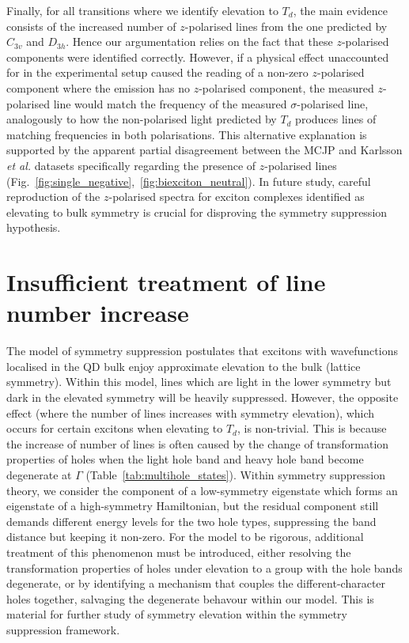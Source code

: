 Finally, for all transitions where we identify elevation to $T_d$, the main evidence consists of the increased number of $z$-polarised lines from the one predicted by $C_{3v}$ and $D_{3h}$. Hence our argumentation relies on the fact that these $z$-polarised components were identified correctly. However, if a physical effect unaccounted for in the experimental setup caused the reading of a non-zero $z$-polarised component where the emission has no $z$-polarised component, the measured $z$-polarised line would match the frequency of the measured $\sigma$-polarised line, analogously to how the non-polarised light predicted by $T_d$ produces lines of matching frequencies in both polarisations. This alternative explanation is supported by the apparent partial disagreement between the MCJP and Karlsson \textit{et al.} datasets specifically regarding the presence of $z$-polarised lines (Fig.~\ref{fig:single_negative},~\ref{fig:biexciton_neutral}). In future study, careful reproduction of the $z$-polarised spectra for exciton complexes identified as elevating to bulk symmetry is crucial for disproving the symmetry suppression hypothesis.

\section{Insufficient treatment of line number increase} \label{sec:failed_degeneracy}
The model of symmetry suppression postulates that excitons with wavefunctions localised in the QD bulk enjoy approximate elevation to the bulk (lattice symmetry). Within this model, lines which are light in the lower symmetry but dark in the elevated symmetry will be heavily suppressed. However, the opposite effect (where the number of lines increases with symmetry elevation), which occurs for certain excitons when elevating to $T_d$, is non-trivial. This is because the increase of number of lines is often caused by the change of transformation properties of holes when the light hole band and heavy hole band become degenerate at $\Gamma$ (Table~\ref{tab:multihole_states}). Within symmetry suppression theory, we consider the component of a low-symmetry eigenstate which forms an eigenstate of a high-symmetry Hamiltonian, but the residual component still demands different energy levels for the two hole types, suppressing the band distance but keeping it non-zero. For the model to be rigorous, additional treatment of this phenomenon must be introduced, either resolving the transformation properties of holes  under elevation to a group with the hole bands degenerate, or by identifying a mechanism that couples the different-character holes together, salvaging the degenerate behavour within our model. This is material for further study of symmetry elevation within the symmetry suppression framework.

